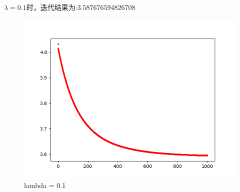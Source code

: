 \documentclass{xjtureport}
\begin{document}
$\lambda = 0.1$时，迭代结果为:$3.587676594826708$
\begin{figure}[H]
    \centering
    \includegraphics[scale = 0.6]{figures/Prox_lam=0.1.png}
    \caption{lambda = 0.1}
    \end{figure}
\end{document}
